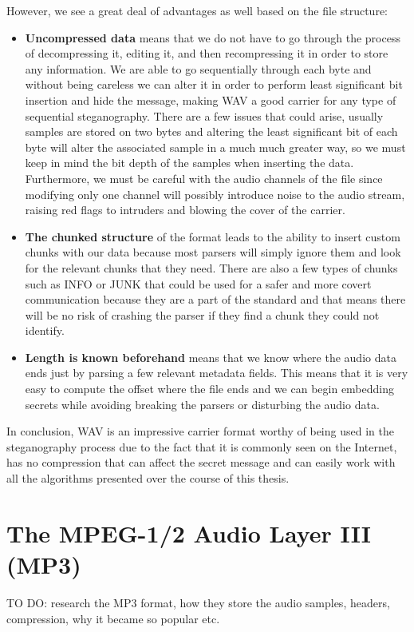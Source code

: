 \begin{multicols*}{2}
However, we see a great deal of advantages as well based on the file structure:
\begin{itemize}
	\item \textbf{Uncompressed data} means that we do not have to go through the process of decompressing it, editing it, and then recompressing it in order to store any information. We are able to go sequentially through each byte and without being careless we can alter it in order  to perform least significant bit insertion and hide the message, making WAV a good carrier for any type of sequential steganography. There are a few issues that could arise, usually samples are stored on two bytes and altering the least significant bit of each byte will alter the associated sample in a much much greater way, so we must keep in mind the bit depth of the samples when inserting the data. Furthermore, we must be careful with the audio channels of the file since modifying only one channel will possibly introduce noise to the audio stream, raising red flags to intruders and blowing the cover of the carrier.
	\item \textbf{The chunked structure} of the format leads to the ability to insert custom chunks with our data because most parsers will simply ignore them and look for the relevant chunks that they need. There are also a few types of chunks such as INFO or JUNK that could be used for a safer and more covert communication because they are a part of the standard and that means there will be no risk of crashing the parser if they find a chunk they could not identify.
	\item \textbf{Length is known beforehand} means that we know where the audio data ends just by parsing a few relevant metadata fields. This means that it is very easy to compute the offset where the file ends and we can begin embedding secrets while avoiding breaking the parsers or disturbing the audio data.
\end{itemize}

In conclusion, WAV is an impressive carrier format worthy of being used in the steganography process due to the fact that it is commonly seen on the Internet, has no compression that can affect the secret message and can easily work with all the algorithms presented over the course of this thesis.

\section{The MPEG-1/2 Audio Layer III (MP3)}
TO DO: research the MP3 format, how they store the audio samples, headers, compression, why it became so popular etc.

\end{multicols*}
